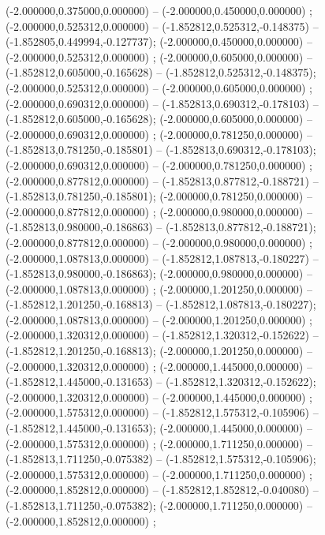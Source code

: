  (-2.000000,0.375000,0.000000) -- (-2.000000,0.450000,0.000000) ;
 (-2.000000,0.525312,0.000000) -- (-1.852812,0.525312,-0.148375) -- (-1.852805,0.449994,-0.127737);
 (-2.000000,0.450000,0.000000) -- (-2.000000,0.525312,0.000000) ;
 (-2.000000,0.605000,0.000000) -- (-1.852812,0.605000,-0.165628) -- (-1.852812,0.525312,-0.148375);
 (-2.000000,0.525312,0.000000) -- (-2.000000,0.605000,0.000000) ;
 (-2.000000,0.690312,0.000000) -- (-1.852813,0.690312,-0.178103) -- (-1.852812,0.605000,-0.165628);
 (-2.000000,0.605000,0.000000) -- (-2.000000,0.690312,0.000000) ;
 (-2.000000,0.781250,0.000000) -- (-1.852813,0.781250,-0.185801) -- (-1.852813,0.690312,-0.178103);
 (-2.000000,0.690312,0.000000) -- (-2.000000,0.781250,0.000000) ;
 (-2.000000,0.877812,0.000000) -- (-1.852813,0.877812,-0.188721) -- (-1.852813,0.781250,-0.185801);
 (-2.000000,0.781250,0.000000) -- (-2.000000,0.877812,0.000000) ;
 (-2.000000,0.980000,0.000000) -- (-1.852813,0.980000,-0.186863) -- (-1.852813,0.877812,-0.188721);
 (-2.000000,0.877812,0.000000) -- (-2.000000,0.980000,0.000000) ;
 (-2.000000,1.087813,0.000000) -- (-1.852812,1.087813,-0.180227) -- (-1.852813,0.980000,-0.186863);
 (-2.000000,0.980000,0.000000) -- (-2.000000,1.087813,0.000000) ;
 (-2.000000,1.201250,0.000000) -- (-1.852812,1.201250,-0.168813) -- (-1.852812,1.087813,-0.180227);
 (-2.000000,1.087813,0.000000) -- (-2.000000,1.201250,0.000000) ;
 (-2.000000,1.320312,0.000000) -- (-1.852812,1.320312,-0.152622) -- (-1.852812,1.201250,-0.168813);
 (-2.000000,1.201250,0.000000) -- (-2.000000,1.320312,0.000000) ;
 (-2.000000,1.445000,0.000000) -- (-1.852812,1.445000,-0.131653) -- (-1.852812,1.320312,-0.152622);
 (-2.000000,1.320312,0.000000) -- (-2.000000,1.445000,0.000000) ;
 (-2.000000,1.575312,0.000000) -- (-1.852812,1.575312,-0.105906) -- (-1.852812,1.445000,-0.131653);
 (-2.000000,1.445000,0.000000) -- (-2.000000,1.575312,0.000000) ;
 (-2.000000,1.711250,0.000000) -- (-1.852813,1.711250,-0.075382) -- (-1.852812,1.575312,-0.105906);
 (-2.000000,1.575312,0.000000) -- (-2.000000,1.711250,0.000000) ;
 (-2.000000,1.852812,0.000000) -- (-1.852812,1.852812,-0.040080) -- (-1.852813,1.711250,-0.075382);
 (-2.000000,1.711250,0.000000) -- (-2.000000,1.852812,0.000000) ;
